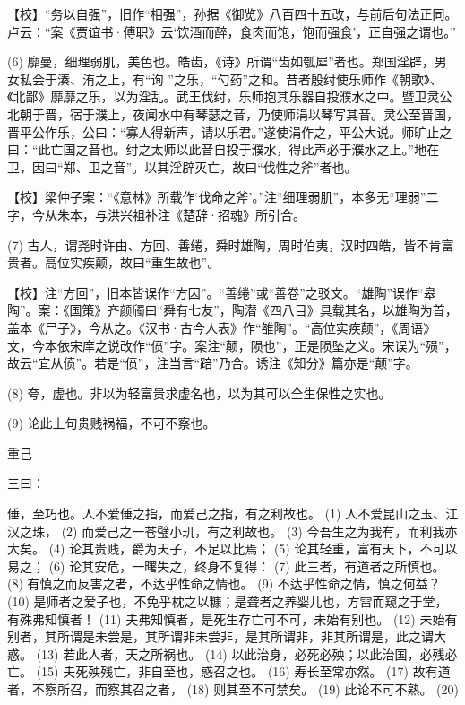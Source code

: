 \documentclass[12pt,UTF8]{ctexbook}
\begin{document}
【校】“务以自强”，旧作“相强”，孙据《御览》八百四十五改，与前后句法正同。卢云：“案《贾谊书·傅职》云‘饮酒而醉，食肉而饱，饱而强食’，正自强之谓也。”

(6) 靡曼，细理弱肌，美色也。皓齿，《诗》所谓“齿如瓠犀”者也。郑国淫辟，男女私会于溱、洧之上，有“询 ”之乐，“勺药”之和。昔者殷纣使乐师作《朝歌》、《北鄙》靡靡之乐，以为淫乱。武王伐纣，乐师抱其乐器自投濮水之中。暨卫灵公北朝于晋，宿于濮上，夜闻水中有琴瑟之音，乃使师涓以琴写其音。灵公至晋国，晋平公作乐，公曰：“寡人得新声，请以乐君。”遂使涓作之，平公大说。师旷止之曰：“此亡国之音也。纣之太师以此音自投于濮水，得此声必于濮水之上。”地在卫，因曰“郑、卫之音”。以其淫辟灭亡，故曰“伐性之斧”者也。

【校】梁仲子案：“《意林》所载作‘伐命之斧’。”注“细理弱肌”，本多无“理弱”二字，今从朱本，与洪兴祖补注《楚辞·招魂》所引合。

(7) 古人，谓尧时许由、方回、善绻，舜时雄陶，周时伯夷，汉时四皓，皆不肯富贵者。高位实疾颠，故曰“重生故也”。

【校】注“方回”，旧本皆误作“方因”。“善绻”或“善卷”之驳文。“雄陶”误作“皋陶”。案：《国策》齐颜斶曰“舜有七友”，陶潜《四八目》具载其名，以雄陶为首，盖本《尸子》，今从之。《汉书·古今人表》作“雒陶”。“高位实疾颠”，《周语》文，今本依宋庠之说改作“偾”字。案注“颠，陨也”，正是陨坠之义。宋误为“殒”，故云“宜从偾”。若是“偾”，注当言“踣”乃合。诱注《知分》篇亦是“颠”字。

(8) 夸，虚也。非以为轻富贵求虚名也，以为其可以全生保性之实也。

(9) 论此上句贵贱祸福，不可不察也。





重己


三曰：

倕，至巧也。人不爱倕之指，而爱己之指，有之利故也。 (1) 人不爱昆山之玉、江汉之珠， (2) 而爱己之一苍璧小玑，有之利故也。 (3) 今吾生之为我有，而利我亦大矣。 (4) 论其贵贱，爵为天子，不足以比焉； (5) 论其轻重，富有天下，不可以易之； (6) 论其安危，一曙失之，终身不复得： (7) 此三者，有道者之所慎也。 (8) 有慎之而反害之者，不达乎性命之情也。 (9) 不达乎性命之情，慎之何益？ (10) 是师者之爱子也，不免乎枕之以糠；是聋者之养婴儿也，方雷而窥之于堂，有殊弗知慎者！ (11) 夫弗知慎者，是死生存亡可不可，未始有别也。 (12) 未始有别者，其所谓是未尝是，其所谓非未尝非，是其所谓非，非其所谓是，此之谓大惑。 (13) 若此人者，天之所祸也。 (14) 以此治身，必死必殃；以此治国，必残必亡。 (15) 夫死殃残亡，非自至也，惑召之也。 (16) 寿长至常亦然。 (17) 故有道者，不察所召，而察其召之者， (18) 则其至不可禁矣。 (19) 此论不可不熟。 (20)
\end{document}
